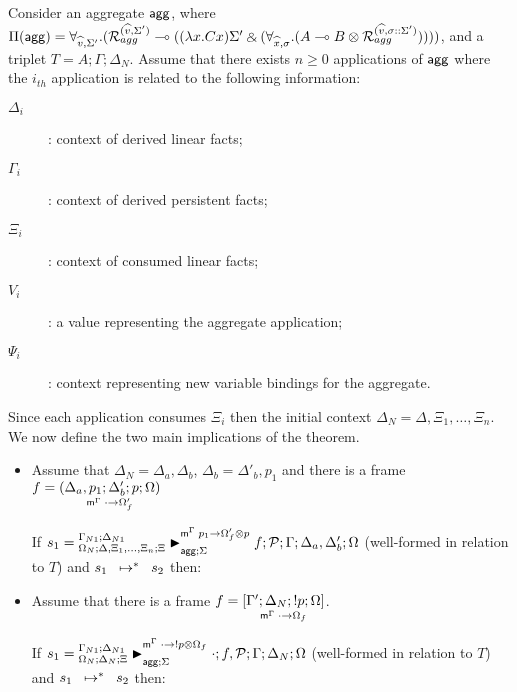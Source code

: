 \begin{theorem}\label{thm:multiple_aggregate_derivation}
Consider an aggregate $\m{agg}$, where $\Pi(\m{agg}) = \forall_{\widehat{v}, \Sigma'}.
   (\defstwo{agg}{\widehat{v}}{\Sigma'} \lolli ((\lambda x. C x)\Sigma' \with (\forall_{\widehat{x}, \sigma}.
                                                (A \lolli B \otimes
                                                 \defstwo{agg}{\widehat{v}}{\sigma
                                                 ::\Sigma'}))))$,
and a triplet $T = A; \Gamma; \Delta_{N}$.
Assume that there exists $n \geq 0$ applications of $\m{agg}$
where the $i_{th}$ application is related to the following information:
\begin{description}
   \item[$\Delta_i$]: context of derived linear facts;
   \item[$\Gamma_i$]: context of derived persistent facts;
   \item[$\Xi_i$]: context of consumed linear facts;
   \item[$V_i$]: a value representing the aggregate application;
   \item[$\Psi_i$]: context representing new variable bindings for the aggregate.
\end{description}

Since each application consumes $\Xi_i$ then the initial context $\Delta_N =
\Delta, \Xi_1, \dotsc, \Xi_n$. We now define the two main implications of the
theorem.

\begin{itemize}[leftmargin=*]
   \item Assume that $\Delta_N = \Delta_a, \Delta_b$, $\Delta_b =
   \Delta'_b, p_1$ and there is a frame $f = \lframe{\Delta_a,
      p_1}{\Delta'_b}{p}{\Omega}{\cdot}{\Omega'_f}$

   If $s_1 = \matstatea{\Delta, \Xi_1, \dotsc, \Xi_n}{f; \lstack{P}}{\Gamma}{\Delta_a,
      \Delta'_b}{\Omega}{p_1 \rightarrow \Omega'_f \otimes p}{\Sigma}$
      (well-formed in relation to $T$) and $\transs{s_1}{s_2}$ then:

   

   \item Assume that there is a frame $f = \pframe{\Gamma'}{\Delta_N}{\bang
      p}{\Omega}{\cdot}{\Omega_f}$.
      
   If $s_1 = \matstatea{\Delta_N}{\cdot;
      f, \lstack{P}}{\Gamma}{\Delta_N}{\Omega}{\cdot \rightarrow \bang p \otimes \Omega_f}{\Sigma}$
      (well-formed in relation to $T$) and $\transs{s_1}{s_2}$ then:

   
\end{itemize}
   
\end{theorem}
